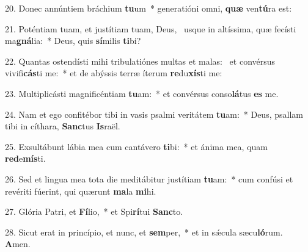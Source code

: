 20. Donec annúntiem bráchium \textbf{tu}um~*  generatióni omni, \textbf{quæ} ven\textbf{tú}ra est:\

21. Poténtiam tuam, et justítiam tuam, Deus, \dag\  usque in altíssima, quæ fecísti ma\textbf{gná}lia:~*  Deus, quis \textbf{sí}milis \textbf{ti}bi?\

22. Quantas ostendísti mihi tribulatiónes multas et malas: \dag\  et convérsus vivifi\textbf{cás}ti me:~*  et de abýssis terræ íterum \textbf{re}du\textbf{xís}ti me:\

23. Multiplicásti magnificéntiam \textbf{tu}am:~*  et convérsus conso\textbf{lá}tus \textbf{es} me.\

24. Nam et ego confitébor tibi in vasis psalmi veritátem \textbf{tu}am:~*  Deus, psallam tibi in cíthara, \textbf{Sanc}tus \textbf{Is}raël.\

25. Exsultábunt lábia mea cum cantávero \textbf{ti}bi:~*  et ánima mea, quam \textbf{red}e\textbf{mís}ti.\

26. Sed et lingua mea tota die meditábitur justítiam \textbf{tu}am:~*  cum confúsi et revériti fúerint, qui quærunt \textbf{ma}la \textbf{mi}hi.\

27. Glória Patri, et \textbf{Fí}lio,~*  et Spi\textbf{rí}tui \textbf{Sanc}to.\

28. Sicut erat in princípio, et nunc, et \textbf{sem}per,~*  et in sǽcula sæcu\textbf{ló}rum. \textbf{A}men.\

